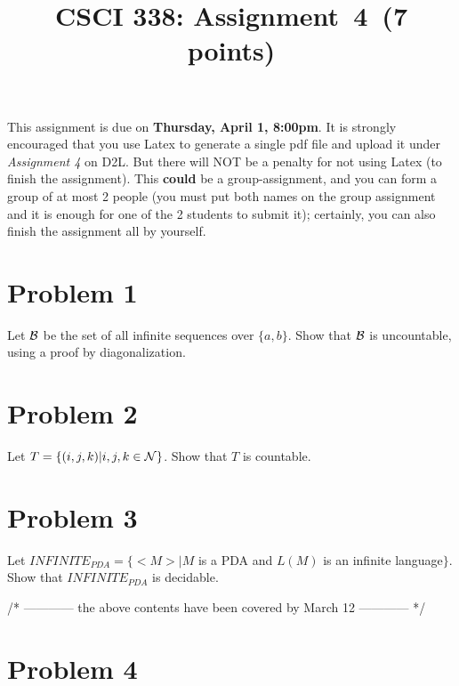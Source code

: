 \documentclass[11pt]{article}
\begin{document}
\date{}

\title{CSCI 338: Assignment~4~(7 points)}




\maketitle

\noindent
This assignment is due on {\bf Thursday, April 1, 8:00pm}. It is strongly
encouraged that you use Latex to generate a single pdf file and upload it
under {\em Assignment 4} on D2L. But there will NOT be a penalty for not
using Latex (to finish the assignment). This {\bf could} be a
group-assignment, and you can form a group of at most 2 people (you must put
both names on the group assignment and it is enough for one of the 2 students
to submit it); certainly, you can also finish the assignment all by yourself.

\section*{Problem 1}

Let ${\cal B}$ be the set of all infinite sequences over $\{a,b\}$. Show that
${\cal B}$ is uncountable, using a proof by diagonalization.


\section*{Problem 2}

Let $T=\{(i,j,k)|i,j,k\in{\cal N}\}$. Show that $T$ is countable.

\section*{Problem 3}

Let $INFINITE_{PDA}=\{<M>|M$ is a PDA and $L(M)$ is an infinite language$\}$.
Show that $INFINITE_{PDA}$ is decidable.
\newline

/* ------------ the above contents have been covered by March 12 ------------ */

\section*{Problem 4}
\end{document}
